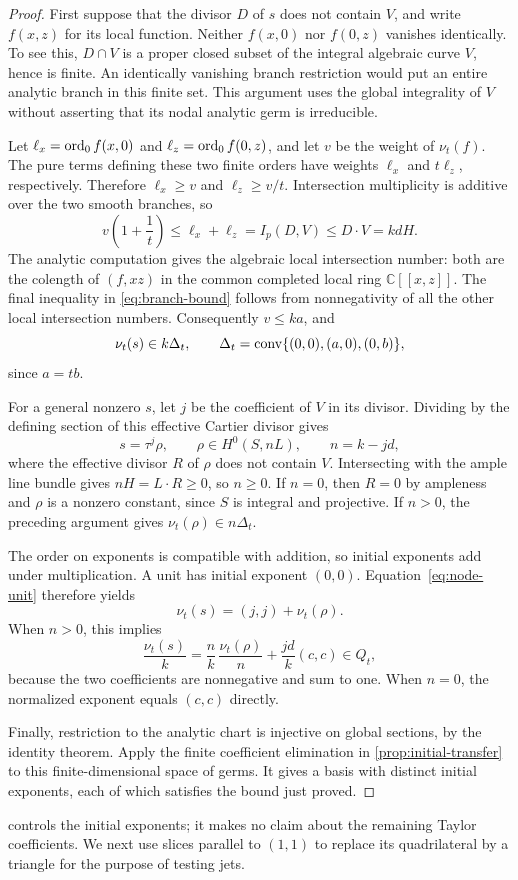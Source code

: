 \begin{proof}
First suppose that the divisor $D$ of $s$ does not contain $V$, and write $f(x,z)$ for its local function.  Neither $f(x,0)$ nor $f(0,z)$ vanishes identically.  To see this, $D\cap V$ is a proper closed subset of the integral algebraic curve $V$, hence is finite.  An identically vanishing branch restriction would put an entire analytic branch in this finite set.  This argument uses the global integrality of $V$ without asserting that its nodal analytic germ is irreducible.

Let $\ell_x=\operatorname{ord}_0f(x,0)$ and $\ell_z=\operatorname{ord}_0f(0,z)$, and let $v$ be the weight of $\nu_t(f)$.  The pure terms defining these two finite orders have weights $\ell_x$ and $t\ell_z$, respectively.  Therefore $\ell_x\ge v$ and $\ell_z\ge v/t$.  Intersection multiplicity is additive over the two smooth branches, so
\begin{equation}
 v\left(1+\frac1t\right)
 \le \ell_x+\ell_z
 = I_p(D,V)
 \le D\cdot V=kdH.
 \label{eq:branch-bound}
\end{equation}
The analytic computation gives the algebraic local intersection number: both are the colength of $(f,xz)$ in the common completed local ring $\mathbb{C}[[x,z]]$.  The final inequality in \eqref{eq:branch-bound} follows from nonnegativity of all the other local intersection numbers. Consequently $v\le ka$, and
\begin{equation}
 \nu_t(s)\in k\Delta_t,\qquad
 \Delta_t=\operatorname{conv}\{(0,0),(a,0),(0,b)\},
 \label{eq:residual-triangle}
\end{equation}
since $a=tb$.

For a general nonzero $s$, let $j$ be the coefficient of $V$ in its divisor.  Dividing by the defining section of this effective Cartier divisor gives
\[
 s=\tau^j\rho,\qquad
 \rho\in H^0(S,nL),\qquad n=k-jd,
\]
where the effective divisor $R$ of $\rho$ does not contain $V$. Intersecting with the ample line bundle gives $nH=L\cdot R\ge0$, so $n\ge0$.  If $n=0$, then $R=0$ by ampleness and $\rho$ is a nonzero constant, since $S$ is integral and projective. If $n>0$, the preceding argument gives $\nu_t(\rho)\in n\Delta_t$.

The order on exponents is compatible with addition, so initial exponents add under multiplication.  A unit has initial exponent $(0,0)$. Equation~\eqref{eq:node-unit} therefore yields
\[
 \nu_t(s)=(j,j)+\nu_t(\rho).
\]
When $n>0$, this implies
\[
 \frac{\nu_t(s)}{k}
 =\frac{n}{k}\,\frac{\nu_t(\rho)}{n}
  +\frac{jd}{k}(c,c)\in Q_t,
\]
because the two coefficients are nonnegative and sum to one.  When $n=0$, the normalized exponent equals $(c,c)$ directly.

Finally, restriction to the analytic chart is injective on global sections, by the identity theorem.  Apply the finite coefficient elimination in \cref{prop:initial-transfer} to this finite-dimensional space of germs.  It gives a basis with distinct initial exponents, each of which satisfies the bound just proved.
\end{proof}

 controls the initial exponents; it makes no claim about the remaining Taylor coefficients.  We next use slices parallel to $(1,1)$ to replace its quadrilateral by a triangle for the purpose of testing jets.
